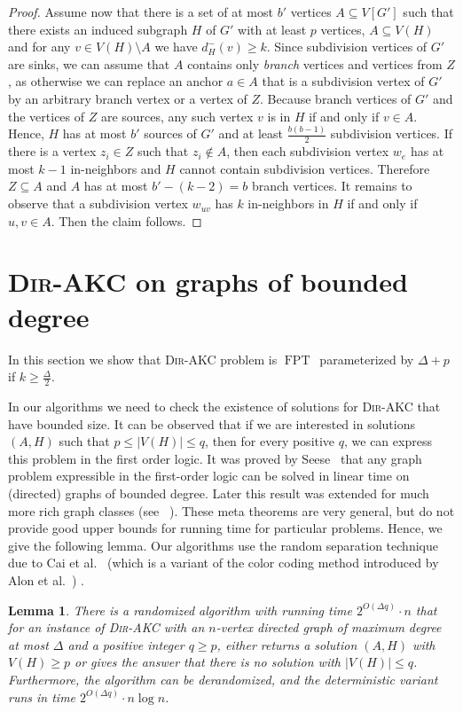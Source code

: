 \documentclass[11pt,a4paper]{article}
\newtheorem{lemma}{Lemma}
\DeclareMathOperator{\operatorClassFPT}{FPT}
\newcommand{\classFPT}{\ensuremath{\operatorClassFPT}}
\newcommand{\DAKC}{\textsc{Dir-AKC}\xspace}
\begin{document}
\begin{proof}
Assume now that there is a set of at most $b'$ vertices $A\subseteq V[G']$ such that there exists an induced subgraph $H$ of
$G'$ with at least $p$ vertices, $A\subseteq V(H)$ and for any $v\in V(H)\setminus A$ we have  $d_H^-(v)\geq k$. Since
subdivision vertices of $G'$ are sinks, we can assume that $A$ contains only \emph{branch} vertices and vertices from $Z$, as
otherwise we can replace an anchor $a\in A$ that is a subdivision vertex of $G'$ by an arbitrary branch vertex or a vertex of
$Z$. Because branch vertices of $G'$ and the vertices of $Z$ are sources, any such vertex $v$ is in $H$ if and only if $v\in
A$. Hence, $H$ has at most $b'$ sources of $G'$ and at least $\frac{b(b-1)}{2}$ subdivision vertices. If there is a vertex
$z_i\in Z$ such that $z_i\notin A$, then each subdivision vertex $w_e$ has at most $k-1$ in-neighbors and $H$ cannot contain
subdivision vertices. Therefore $Z\subseteq A$ and $A$ has at most $b'-(k-2)=b$ branch vertices. It remains to observe that a
subdivision vertex $w_{uv}$ has $k$ in-neighbors in $H$ if and only if $u,v\in A$. Then the claim follows.
\end{proof}

\section{\DAKC on graphs of bounded degree}
\label{sec:bound-deg} 
In this section we show that \DAKC problem is \classFPT\ parameterized by $\Delta+p$ if
$k\geq\frac{\Delta}{2}$.

In our algorithms we need to check the existence of solutions for \DAKC that have bounded size. It can be observed that if we
are interested in solutions $(A,H)$ such that $p\leq |V(H)|\leq q$, then for every positive $q$, we can express this problem
in the first order logic. It was proved by Seese~\cite{Seese96} that any graph problem expressible in the first-order logic
can be solved in linear time on (directed) graphs of bounded degree. Later this result was extended for much more rich graph
classes (see~\cite{DvorakKT10} ). These meta theorems are very general, but do not provide
good upper bounds for running time for particular problems. Hence, we give the following lemma.
Our algorithms use the random separation technique due to Cai et al.~\cite{CaiCC06} (which is a variant of the color coding
method introduced by Alon et al.~\cite{AlonYZ95}) .


\begin{lemma}\label{lem:bounded}
There is a randomized algorithm with running time $2^{O(\Delta q)}\cdot n$ that for an instance of \DAKC with an $n$-vertex
directed graph of maximum degree at most $\Delta$ and a positive integer $q\geq p$, either returns a solution $(A,H)$ with $V(H)\geq p$ or gives the answer
that there is no solution with $|V(H)|\leq q$. Furthermore, the algorithm can be derandomized, and the deterministic variant
runs in time  $2^{O(\Delta q)}\cdot n\log n$.
\end{lemma}
\end{document}
